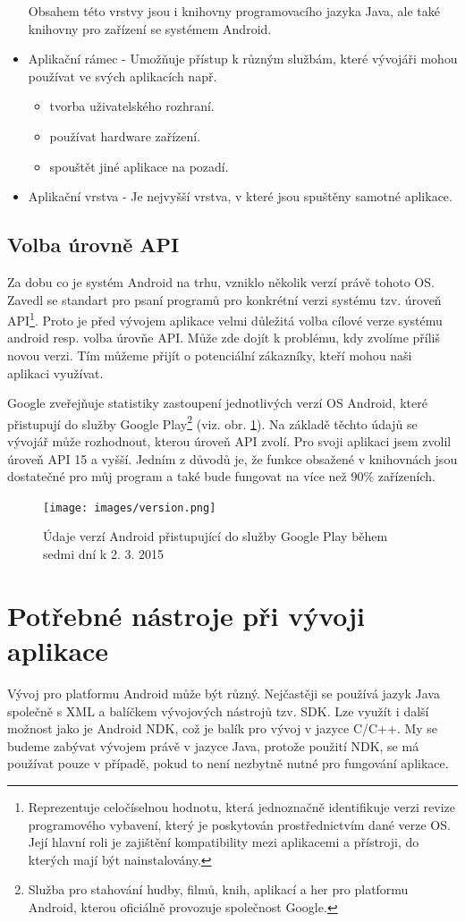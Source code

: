 \documentclass[12pt]{article}
\begin{document}
\begin{itemize}
Obsahem této vrstvy jsou i knihovny programovacího jazyka Java, ale také knihovny pro zařízení se systémem Android.
\item Aplikační rámec - Umožňuje přístup k různým službám, které vývojáři mohou používat ve svých aplikacích např.
\begin{itemize}
\item tvorba uživatelského rozhraní.
\item používat hardware zařízení.
\item spouštět jiné aplikace na pozadí.
\end{itemize}
\item Aplikační vrstva - Je nejvyšší vrstva, v které jsou spuštěny samotné aplikace.
\end{itemize}
\subsection{Volba úrovně API}
Za dobu co je systém Android na trhu, vzniklo několik verzí právě tohoto OS. Zavedl se standart pro psaní programů pro konkrétní verzi systému tzv. úroveň API\footnote[2]{Reprezentuje celočíselnou hodnotu, která jednoznačně identifikuje verzi revize programového vybavení, který je poskytován prostřednictvím dané verze OS. Její hlavní roli je zajištění kompatibility mezi aplikacemi a přístroji, do kterých mají být nainstalovány.}. Proto je před vývojem aplikace velmi důležitá volba cílové verze systému android resp. volba úrovňe API. Může zde dojít k problému, kdy zvolíme příliš novou verzi. Tím můžeme přijít o potenciální zákazníky, kteří mohou naši aplikaci využívat.

Google zveřejňuje statistiky zastoupení jednotlivých verzí OS Android, které přistupují do služby Google Play\footnote[3]{Služba pro stahování hudby, filmů, knih, aplikací a her pro platformu Android, kterou oficiálně provozuje společnost Google.} (viz. obr. \ref{api}).
Na základě těchto údajů se vývojář může rozhodnout, kterou úroveň API zvolí. Pro svoji aplikaci jsem zvolil úroveň API 15 a vyšší. Jedním z důvodů je, že funkce obsažené v knihovnách jsou dostatečné pro můj program a také bude fungovat na více než 90\% zařízeních.
\begin{figure}[ht]
\centerline{\texttt{[image: images/version.png]}}
\caption{Údaje verzí Android přistupující do služby Google Play během sedmi dní k 2. 3. 2015\cite{volba}} \label{api}
\end{figure}


\newpage
\section{Potřebné nástroje při vývoji aplikace}
Vývoj pro platformu Android může být různý. Nejčastěji se používá jazyk Java společně s XML a balíčkem vývojových nástrojů tzv. SDK. Lze využít i další možnost jako je Android NDK, což je balík pro vývoj v jazyce C/C++. My se budeme zabývat vývojem právě v jazyce Java, protože použití NDK, se má používat pouze v případě, pokud to není nezbytně nutné pro fungování aplikace.
\end{document}
